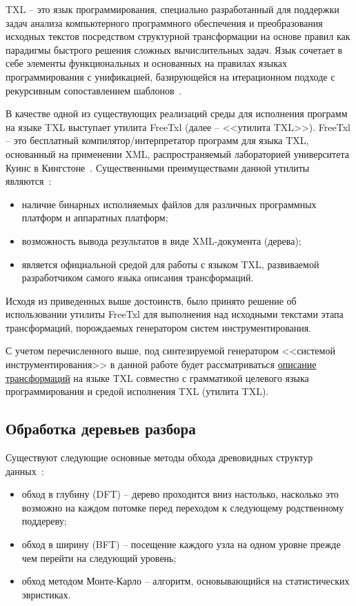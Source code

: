 TXL -- это язык программирования, специально разработанный для поддержки задач анализа компьютерного программного обеспечения и преобразования исходных текстов посредством структурной трансформации на основе правил как парадигмы быстрого решения сложных вычислительных задач.
Язык сочетает в себе элементы функциональных и основанных на правилах языках программирования с унификацией, базирующейся на итерационном  подходе с рекурсивным сопоставлением шаблонов~\cite{txl-about}.

В качестве одной из существующих реализаций среды для исполнения программ на языке TXL выступает утилита FreeTxl (далее -- <<утилита TXL>>).
FreeTxl -- это бесплатный компилятор/интерпретатор программ для языка TXL, основанный на применении XML, распространяемый лабораторией университета Куинс в Кингстоне~\cite{txl-freetxl}.
Существенными преимуществами данной утилиты являются~\cite{txl-freetxl}:
\begin{itemize}[noitemsep]
  \item наличие бинарных исполняемых файлов для различных программных платформ и аппаратных платформ;
  \item возможность вывода результатов в виде XML-документа (дерева);
  \item является официальной средой для работы с языком TXL, развиваемой разработчиком самого языка описания трансформаций.
\end{itemize}

Исходя из приведенных выше достоинств, было принято решение об использовании утилиты FreeTxl для выполнения над исходными текстами этапа трансформаций, порождаемых генератором систем инструментирования.

С учетом перечисленного выше, под синтезируемой генератором <<системой инструментирования>> в данной работе будет рассматриваться \underline{описание трансформаций} на языке TXL совместно с грамматикой целевого языка программирования и средой исполнения TXL (утилита TXL).

\subsection{Обработка деревьев разбора}

Существуют следующие основные методы обхода древовидных структур данных~\cite{cormen2009introduction}:
\begin{itemize}[noitemsep]
  \item обход в глубину (DFT) -- дерево проходится вниз настолько, насколько это возможно на каждом потомке перед переходом к следующему родственному поддереву;
  \item обход в ширину (BFT) -- посещение каждого узла на одном уровне прежде чем перейти на следующий уровень;
  \item обход методом Монте-Карло -- алгоритм, основывающийся на статистических эвристиках.
\end{itemize}

